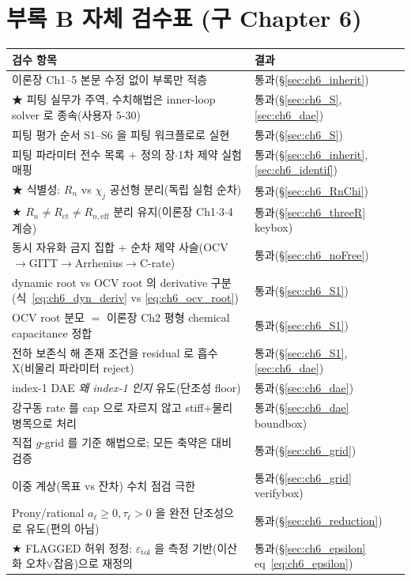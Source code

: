 \documentclass[11pt,a4paper]{article}
\newcommand{\eff}{\mathrm{eff}}
\newcommand{\ct}{\mathrm{ct}}
\newcommand{\tol}{\mathrm{tol}}
\begin{document}
\section{부록 B 자체 검수표 (구 Chapter 6)}\label{sec:ch6_selfcheck}
{\small
\begin{longtable}{p{} p{}}
\toprule 검수 항목 & 결과 \\ \midrule \endhead
이론장 Ch1--5 본문 수정 없이 부록만 적층 & 통과(\S\ref{sec:ch6_inherit}) \\
★ 피팅 실무가 주역, 수치해법은 inner-loop solver 로 종속(사용자 5-30) & 통과(\S\ref{sec:ch6_S},\ref{sec:ch6_dae}) \\
피팅 평가 순서 S1--S6 을 피팅 워크플로로 실현 & 통과(\S\ref{sec:ch6_S}) \\
피팅 파라미터 전수 목록 $+$ 정의 장$\cdot$1차 제약 실험 매핑 & 통과(\S\ref{sec:ch6_inherit},\ref{sec:ch6_identif}) \\
★ 식별성: $R_n$ vs $\chi_j$ 공선형 분리(독립 실험 순차) & 통과(\S\ref{sec:ch6_RnChi}) \\
★ $R_n\ne R_\ct\ne R_{n,\eff}$ 분리 유지(이론장 Ch1$\cdot$3$\cdot$4 계승) & 통과(\S\ref{sec:ch6_threeR} keybox) \\
동시 자유화 금지 집합 $+$ 순차 제약 사슬(OCV$\to$GITT$\to$Arrhenius$\to$C-rate) & 통과(\S\ref{sec:ch6_noFree}) \\
dynamic root vs OCV root 의 derivative 구분(식~\eqref{eq:ch6_dyn_deriv} vs \eqref{eq:ch6_ocv_root}) & 통과(\S\ref{sec:ch6_S1}) \\
OCV root 분모 $=$ 이론장 Ch2 평형 chemical capacitance 정합 & 통과(\S\ref{sec:ch6_S1}) \\
전하 보존식 해 존재 조건을 residual 로 흡수 X(비물리 파라미터 reject) & 통과(\S\ref{sec:ch6_S1},\ref{sec:ch6_dae}) \\
index-1 DAE \emph{왜 index-1 인지} 유도(단조성 floor) & 통과(\S\ref{sec:ch6_dae}) \\
강구동 rate 를 cap 으로 자르지 않고 stiff$+$물리 병목으로 처리 & 통과(\S\ref{sec:ch6_dae} boundbox) \\
직접 $g$-grid 를 기준 해법으로; 모든 축약은 대비 검증 & 통과(\S\ref{sec:ch6_grid}) \\
이중 계상(목표 vs 잔차) 수치 점검 극한 & 통과(\S\ref{sec:ch6_grid} verifybox) \\
Prony/rational $a_\ell\ge0,\tau_\ell>0$ 을 완전 단조성으로 유도(편의 아님) & 통과(\S\ref{sec:ch6_reduction}) \\
★ FLAGGED 허위 정정: $\varepsilon_\tol$ 을 측정 기반(이산화 오차$\vee$잡음)으로 재정의 & 통과(\S\ref{sec:ch6_epsilon} eq~\eqref{eq:ch6_epsilon}) \\

\end{longtable}}
\end{document}
